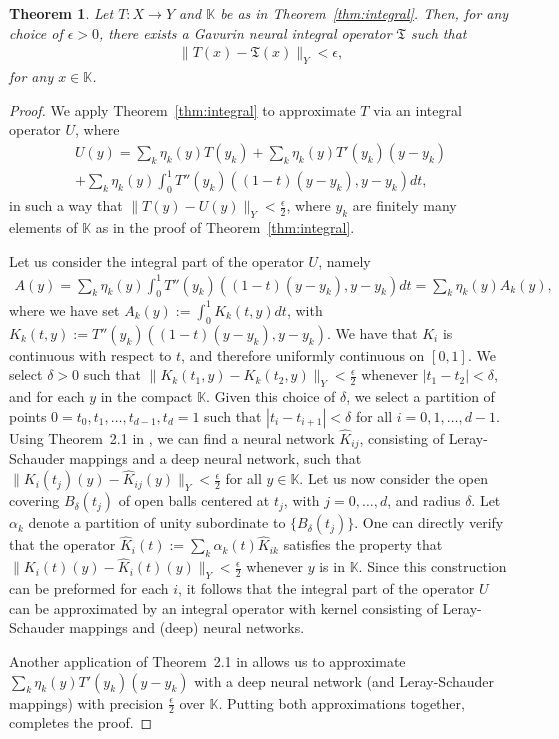 \documentclass[a4paper,12pt,reqno]{amsart}
\newtheorem{thm}{Theorem}[section]
\theoremstyle{definition}
\theoremstyle{remark}
\begin{document}
\begin{thm}\label{thm:approx_neural_int}
    Let $T: X \longrightarrow Y$ and $\mathbb K$ be as in Theorem~\ref{thm:integral}. Then, for any choice of $\epsilon > 0$, there exists a Gavurin neural integral operator $\mathfrak T$ such that
    \begin{eqnarray*}
        \|T(x) - \mathfrak T(x)\|_Y < \epsilon,
    \end{eqnarray*}
    for any $x\in \mathbb K$. 
\end{thm}
\begin{proof}
         We apply Theorem~\ref{thm:integral} to approximate $T$ via an integral operator $U$, where 
\begin{multline*}
 U(y) = \sum_k \eta_k(y)T(y_k)+\sum_k \eta_k(y)T'(y_k)(y-y_k)\\  + \sum_k \eta_k(y)\int_0^1 T''(y_k)((1-t)(y-y_k),y-y_k)dt, 
\end{multline*} 
in such a way that $\|T(y) - U(y)\|_Y < \frac{\epsilon}{2}$, where $y_k$ are finitely many elements of $\mathbb K$ as in the proof of Theorem~\ref{thm:integral}. 

Let us consider the integral part of the operator $U$, namely 
\begin{eqnarray*}
    A(y) = \sum_k \eta_k(y)\int_0^1 T''(y_k)((1-t)(y-y_k),y-y_k)dt = \sum_k \eta_k(y)A_k(y),
\end{eqnarray*} where we have set $A_k(y) := \int_0^1 K_k(t,y)dt$, with $K_k(t,y) := T''(y_k)((1-t)(y-y_k),y-y_k)$. We have that $K_i$ is continuous with respect to $t$, and therefore uniformly continuous on $[0,1]$. We select $\delta>0$ such that $\|K_k(t_1,y) - K_k(t_2,y)\|_Y < \frac{\epsilon}{2}$ whenever $|t_1-t_2|<\delta$, and for each $y$ in the compact $\mathbb K$. Given this choice of $\delta$, we select a partition of points $0 = t_0, t_1, \ldots , t_{d-1}, t_d = 1$ such that $|t_i - t_{i+1}| < \delta$ for all $i = 0, 1, \ldots , d-1$. Using Theorem~2.1 in \cite{EZ}, we can find a neural network $\hat K_{ij}$, consisting of Leray-Schauder mappings and a deep neural network, such that $\|K_i(t_j)(y) - \hat K_{ij}(y)\|_Y < \frac{\epsilon}{2}$ for all $y\in \mathbb K$. Let us now consider the open covering $B_\delta(t_j)$ of open balls centered at $t_j$, with $j=0, \ldots, d$, and radius $\delta$. Let $\alpha_k$ denote a partition of unity subordinate to $\{B_\delta(t_j)\}$. One can directly verify that the operator $\hat K_i(t) := \sum_k \alpha_k(t)\hat K_{ik}$ satisfies the property that $\|K_i(t)(y)- \hat K_i(t)(y)\|_Y < \frac{\epsilon}{2}$ whenever $y$ is in $\mathbb K$. Since this construction can be preformed for each $i$, it follows that the integral part of the operator $U$ can be approximated by an integral operator with kernel consisting of Leray-Schauder mappings and (deep) neural networks. 

Another application of Theorem~2.1 in \cite{EZ} allows us to approximate $\sum_k \eta_k(y)T'(y_k)(y-y_k)$ with a deep neural network (and Leray-Schauder mappings) with precision $\frac{\epsilon}{2}$ over $\mathbb K$. Putting both approximations together, completes the proof.
\end{proof} 
\end{document}
